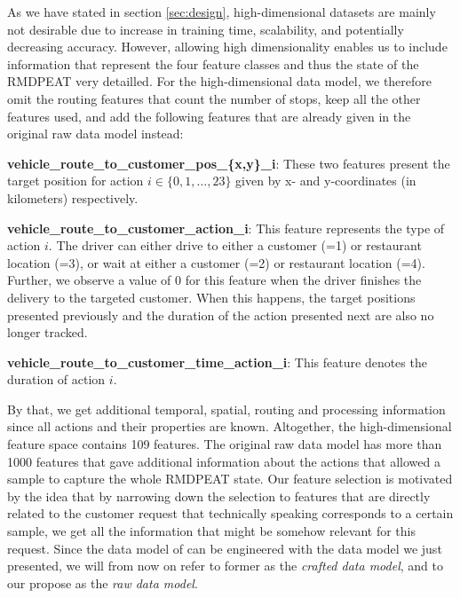 As we have stated in section \ref{sec:design}, high-dimensional datasets are mainly not desirable due to increase in training time, scalability, and potentially decreasing accuracy. However, allowing high dimensionality enables us to include information that represent the four feature classes and thus the state of the RMDPEAT very detailled. For the high-dimensional data model, we therefore omit the routing features that count the number of stops, keep all the other features \cite{Hildebrandt2020_EAT} used, and add the following features that are already given in the original raw data model instead:
\begin{description}[font=$\bullet$\scshape\bfseries]
	\item \textbf{vehicle\_route\_to\_customer\_pos\_\{x,y\}\_i}: These two features present the target position for action $ i \in \{0, 1, \dots, 23\}$ given by x- and y-coordinates (in kilometers) respectively. 
	\item  \textbf{vehicle\_route\_to\_customer\_action\_i}:
	This feature represents the type of action $ i $. The driver can either drive to either a customer (=1) or restaurant location (=3), or wait at either a customer (=2) or restaurant location (=4). Further, we observe a value of 0 for this feature when the driver finishes the delivery to the targeted customer. When this happens, the target positions presented previously and the duration of the action presented next are also no longer tracked. 
	\item
	\textbf{vehicle\_route\_to\_customer\_time\_action\_i}: This feature denotes the duration of action $ i $.
\end{description}
By that, we get additional temporal, spatial, routing and processing information since all actions and their properties are known. Altogether, the high-dimensional feature space contains 109 features. The original raw data model has more than 1000 features that gave additional information about the actions that allowed a sample to capture the whole RMDPEAT state. Our feature selection is motivated by the idea that by narrowing down the selection to features that are directly related to the customer request that technically speaking corresponds to a certain sample, we get all the information that might be somehow relevant for this request. Since the data model of \cite{Hildebrandt2020_EAT} can be engineered with the data model we just presented, we will from now on refer to former as the \textit{crafted data model}, and to our propose as the \textit{raw data model}.

